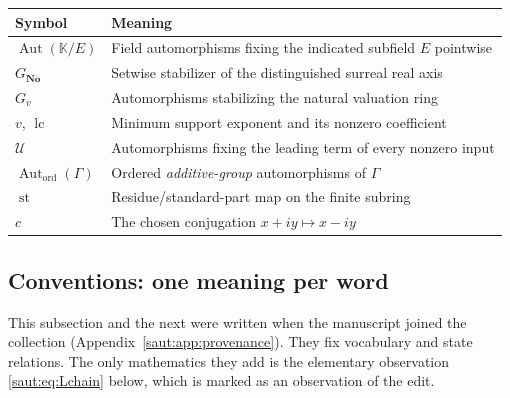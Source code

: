 \documentclass[11pt]{article}
\theoremstyle{definition}
\theoremstyle{remark}
\newcommand{\No}{\mathbf{No}}
\newcommand{\K}{\mathbb K}
\newcommand{\U}{\mathcal U}
\newcommand{\Aut}{\operatorname{Aut}}
\newcommand{\lc}{\operatorname{lc}}
\newcommand{\st}{\operatorname{st}}
\newcommand{\Gh}{\operatorname{Aut}_{\mathrm{ord}}(\Gamma)}
\numberwithin{equation}{section}
\begin{document}
\begin{center}
\small
\begin{tabular}{@{}>{\RaggedRight\arraybackslash}p{}>{\RaggedRight\arraybackslash}p{}@{}}
\toprule
Symbol & Meaning\\
\midrule
$\Aut(\K/E)$ & Field automorphisms fixing the indicated subfield $E$ pointwise\\
$G_{\No}$ & Setwise stabilizer of the distinguished surreal real axis\\
$G_v$ & Automorphisms stabilizing the natural valuation ring\\
$v$, $\lc$ & Minimum support exponent and its nonzero coefficient\\
$\U$ & Automorphisms fixing the leading term of every nonzero input\\
$\Gh$ & Ordered \emph{additive-group} automorphisms of $\Gamma$\\
$\st$ & Residue/standard-part map on the finite subring\\
$c$ & The chosen conjugation $x+iy\mapsto x-iy$\\
\bottomrule
\end{tabular}
\end{center}

\subsection{Conventions: one meaning per word}\label{saut:sec:conventions}

This subsection and the next were written when the manuscript joined the
collection (Appendix~\ref{saut:app:provenance}). They fix vocabulary and
state relations. The only mathematics they add is the elementary observation
\eqref{saut:eq:Lchain} below, which is marked as an observation of the edit.
\end{document}
